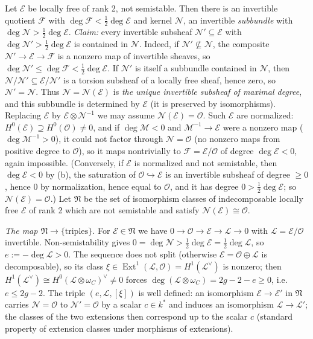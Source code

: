 \documentclass[11pt]{article}
\begin{document}
Let $\mathcal E$ be locally free of rank 2, not semistable. Then there is an invertible quotient $\mathcal F$ with $\deg\mathcal F<\frac12\deg\mathcal E$ and kernel $\mathcal N$, an invertible \emph{subbundle} with $\deg\mathcal N>\frac12\deg\mathcal E$. \emph{Claim:} every invertible subsheaf $\mathcal N'\subseteq\mathcal E$ with $\deg\mathcal N'>\frac12\deg\mathcal E$ is contained in $\mathcal N$. Indeed, if $\mathcal N'\not\subseteq\mathcal N$, the composite $\mathcal N'\to\mathcal E\to\mathcal F$ is a nonzero map of invertible sheaves, so $\deg\mathcal N'\le\deg\mathcal F<\frac12\deg\mathcal E$. If $\mathcal N'$ is itself a subbundle contained in $\mathcal N$, then $\mathcal N/\mathcal N'\subseteq\mathcal E/\mathcal N'$ is a torsion subsheaf of a locally free sheaf, hence zero, so $\mathcal N'=\mathcal N$. Thus $\mathcal N=\mathcal N(\mathcal E)$ is \emph{the unique invertible subsheaf of maximal degree}, and this subbundle is determined by $\mathcal E$ (it is preserved by isomorphisms). Replacing $\mathcal E$ by $\mathcal E\otimes\mathcal N^{-1}$ we may assume $\mathcal N(\mathcal E)=\mathcal O$. Such $\mathcal E$ are normalized: $H^0(\mathcal E)\supseteq H^0(\mathcal O)\ne0$, and if $\deg\mathcal M<0$ and $\mathcal M^{-1}\to\mathcal E$ were a nonzero map ($\deg\mathcal M^{-1}>0$), it could not factor through $\mathcal N=\mathcal O$ (no nonzero maps from positive degree to $\mathcal O$), so it maps nontrivially to $\mathcal F=\mathcal E/\mathcal O$ of degree $\deg\mathcal E<0$, again impossible. (Conversely, if $\mathcal E$ is normalized and not semistable, then $\deg\mathcal E<0$ by (b), the saturation of $\mathcal O\hookrightarrow\mathcal E$ is an invertible subsheaf of degree $\ge0$, hence $0$ by normalization, hence equal to $\mathcal O$, and it has degree $0>\frac12\deg\mathcal E$; so $\mathcal N(\mathcal E)=\mathcal O$.) Let $\mathfrak N$ be the set of isomorphism classes of indecomposable locally free $\mathcal E$ of rank 2 which are not semistable and satisfy $\mathcal N(\mathcal E)\cong\mathcal O$.

\emph{The map $\mathfrak N\to\{\text{triples}\}$.} For $\mathcal E\in\mathfrak N$ we have $0\to\mathcal O\to\mathcal E\to\mathcal L\to0$ with $\mathcal L=\mathcal E/\mathcal O$ invertible. Non-semistability gives $0=\deg\mathcal N>\frac12\deg\mathcal E=\frac12\deg\mathcal L$, so $e:=-\deg\mathcal L>0$. The sequence does not split (otherwise $\mathcal E=\mathcal O\oplus\mathcal L$ is decomposable), so its class $\xi\in\operatorname{Ext}^1(\mathcal L,\mathcal O)=H^1(\mathcal L^\vee)$ is nonzero; then $H^1(\mathcal L^\vee)\cong H^0(\mathcal L\otimes\omega_C)^\vee\ne0$ forces $\deg(\mathcal L\otimes\omega_C)=2g-2-e\ge0$, i.e.\ $e\le2g-2$. The triple $(e,\mathcal L,[\xi])$ is well defined: an isomorphism $\mathcal E\to\mathcal E'$ in $\mathfrak N$ carries $\mathcal N=\mathcal O$ to $\mathcal N'=\mathcal O$ by a scalar $c\in k^*$ and induces an isomorphism $\mathcal L\to\mathcal L'$; the classes of the two extensions then correspond up to the scalar $c$ (standard property of extension classes under morphisms of extensions).
\end{document}
